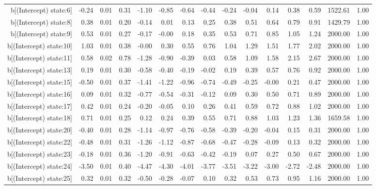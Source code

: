 \begin{table}[ht]
\begin{tabular}{rrrrrrrrrrrrrrr}
  b[(Intercept) state:6] & -0.24 & 0.01 & 0.31 & -1.10 & -0.85 & -0.64 & -0.44 & -0.24 & -0.04 & 0.14 & 0.38 & 0.59 & 1522.61 & 1.00 \\ 
  b[(Intercept) state:8] & 0.38 & 0.01 & 0.20 & -0.14 & 0.01 & 0.13 & 0.25 & 0.38 & 0.51 & 0.64 & 0.79 & 0.91 & 1429.79 & 1.00 \\ 
  b[(Intercept) state:9] & 0.53 & 0.01 & 0.27 & -0.17 & -0.00 & 0.18 & 0.35 & 0.53 & 0.71 & 0.85 & 1.05 & 1.24 & 2000.00 & 1.00 \\ 
  b[(Intercept) state:10] & 1.03 & 0.01 & 0.38 & -0.00 & 0.30 & 0.55 & 0.76 & 1.04 & 1.29 & 1.51 & 1.77 & 2.02 & 2000.00 & 1.00 \\ 
  b[(Intercept) state:11] & 0.58 & 0.02 & 0.78 & -1.28 & -0.90 & -0.39 & 0.03 & 0.58 & 1.09 & 1.58 & 2.15 & 2.67 & 2000.00 & 1.00 \\ 
  b[(Intercept) state:13] & 0.19 & 0.01 & 0.30 & -0.58 & -0.40 & -0.19 & -0.02 & 0.19 & 0.39 & 0.57 & 0.76 & 0.92 & 2000.00 & 1.00 \\ 
  b[(Intercept) state:15] & -0.50 & 0.01 & 0.37 & -1.41 & -1.22 & -0.96 & -0.74 & -0.49 & -0.25 & -0.00 & 0.21 & 0.47 & 2000.00 & 1.00 \\ 
  b[(Intercept) state:16] & 0.09 & 0.01 & 0.32 & -0.77 & -0.54 & -0.31 & -0.12 & 0.09 & 0.30 & 0.50 & 0.71 & 0.89 & 2000.00 & 1.00 \\ 
  b[(Intercept) state:17] & 0.42 & 0.01 & 0.24 & -0.20 & -0.05 & 0.10 & 0.26 & 0.41 & 0.59 & 0.72 & 0.88 & 1.02 & 2000.00 & 1.00 \\ 
  b[(Intercept) state:18] & 0.71 & 0.01 & 0.25 & 0.12 & 0.24 & 0.39 & 0.55 & 0.71 & 0.88 & 1.03 & 1.23 & 1.36 & 1659.58 & 1.00 \\ 
  b[(Intercept) state:20] & -0.40 & 0.01 & 0.28 & -1.14 & -0.97 & -0.76 & -0.58 & -0.39 & -0.20 & -0.04 & 0.15 & 0.31 & 2000.00 & 1.00 \\ 
  b[(Intercept) state:22] & -0.48 & 0.01 & 0.31 & -1.26 & -1.12 & -0.87 & -0.68 & -0.47 & -0.28 & -0.09 & 0.13 & 0.32 & 2000.00 & 1.00 \\ 
  b[(Intercept) state:23] & -0.18 & 0.01 & 0.36 & -1.20 & -0.91 & -0.63 & -0.42 & -0.19 & 0.07 & 0.27 & 0.50 & 0.67 & 2000.00 & 1.00 \\ 
  b[(Intercept) state:24] & -3.50 & 0.01 & 0.40 & -4.47 & -4.30 & -4.01 & -3.77 & -3.51 & -3.22 & -3.00 & -2.72 & -2.48 & 2000.00 & 1.00 \\ 
  b[(Intercept) state:25] & 0.32 & 0.01 & 0.32 & -0.50 & -0.28 & -0.07 & 0.10 & 0.32 & 0.53 & 0.73 & 0.95 & 1.16 & 2000.00 & 1.00 \\ 

\end{tabular}
\end{table}
